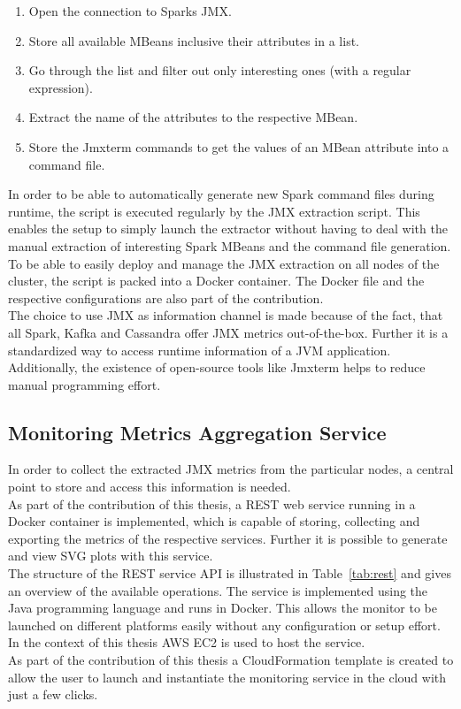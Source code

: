 \begin{enumerate}
    \item Open the connection to Sparks JMX.
    \item Store all available MBeans inclusive their attributes in a list.
    \item Go through the list and filter out only interesting ones (with a regular expression).
    \item Extract the name of the attributes to the respective MBean.
    \item Store the Jmxterm commands to get the values of an MBean attribute into a command file.
\end{enumerate}

In order to be able to automatically generate new Spark command files during runtime, the script is executed regularly by the JMX extraction script.
This enables the setup to simply launch the extractor without having to deal with the manual extraction of interesting Spark MBeans and the command file generation.\\
To be able to easily deploy and manage the JMX extraction on all nodes of the cluster, the script is packed into a Docker container.
The Docker file and the respective configurations are also part of the contribution.\\

The choice to use JMX as information channel is made because of the fact, that all Spark, Kafka and Cassandra offer JMX metrics out-of-the-box.
Further it is a standardized way to access runtime information of a JVM application.
Additionally, the existence of open-source tools like Jmxterm helps to reduce manual programming effort.



\subsection{Monitoring Metrics Aggregation Service}
In order to collect the extracted JMX metrics from the particular nodes, a central point to store and access this information is needed.\\
As part of the contribution of this thesis, a REST web service running in a Docker container is implemented, which is capable of storing, collecting and exporting the metrics of the respective services.
Further it is possible to generate and view SVG plots with this service.\\

The structure of the REST service API is illustrated in Table~\ref{tab:rest} and gives an overview of the available operations.
The service is implemented using the Java programming language and runs in Docker.
This allows the monitor to be launched on different platforms easily without any configuration or setup effort.
In the context of this thesis AWS EC2 is used to host the service.\\
As part of the contribution of this thesis a CloudFormation template is created to allow the user to launch and instantiate the monitoring service in the cloud with just a few clicks.\\

